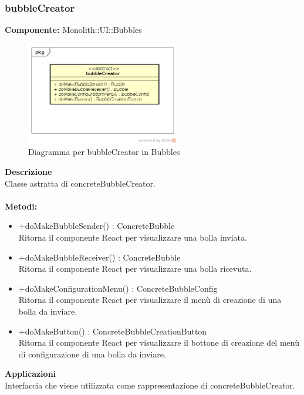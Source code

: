\subsubsection{bubbleCreator}
\textbf{Componente:}  Monolith::UI::Bubbles\\
   \FloatBarrier
   \begin{figure}[ht]
   \centering
   \includegraphics[width=0.6\textwidth]{img/single-bubbleCreator}
   \caption{{Diagramma per bubbleCreator in Bubbles}}
\end{figure}
\FloatBarrier
\textbf{Descrizione}\\
Classe astratta di concreteBubbleCreator. \\\\ 
\textbf{Metodi:} \\
\begin{itemize}\item +doMakeBubbleSender() : ConcreteBubble \\Ritorna il componente React per visualizzare una bolla inviata.\item +doMakeBubbleReceiver() : ConcreteBubble \\Ritorna il componente React per visualizzare una bolla ricevuta.\item +doMakeConfigurationMenu() : ConcreteBubbleConfig \\Ritorna il componente React per visualizzare il menù di creazione di una bolla da inviare.\item +doMakeButton() : ConcreteBubbleCreationButton \\Ritorna il componente React per visualizzare il bottone di creazione del menù di configurazione di una bolla da inviare.

\end{itemize} 


\textbf{Applicazioni}\\
Interfaccia che viene utilizzata come rappresentazione di concreteBubbleCreator. 


\clearpage

